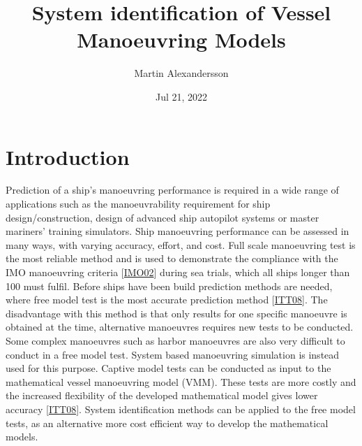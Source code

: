 \documentclass[review]{elsarticle}
\title{System identification of Vessel Manoeuvring Models}
\date{Jul 21, 2022}
\author{Martin Alexandersson}
\begin{document}



\pagestyle{empty}

\pagestyle{plain}

\pagestyle{normal}
\label{\detokenize{index::doc}}



\section{Introduction}
\label{\detokenize{00.02_introduction:introduction}}\label{\detokenize{00.02_introduction::doc}}
\sphinxAtStartPar
Prediction of a ship’s manoeuvring performance is required in a wide range of applications such as the manoeuvrability requirement for ship design/construction, design of advanced ship autopilot systems or master mariners’ training simulators. Ship manoeuvring performance can be assessed in many ways, with varying accuracy, effort, and cost. Full scale manoeuvring test is the most reliable method and is used to demonstrate the compliance with the IMO manoeuvring criteria {[}\hyperlink{cite.bibligraphy:id16}{IMO02}{]} during sea trials, which all ships longer than 100 must fulfil. Before ships have been build prediction methods are needed, where free model test is the most accurate prediction method {[}\hyperlink{cite.bibligraphy:id75}{ITT08}{]}. The disadvantage with this method is that only results for one specific manoeuvre is obtained at the time, alternative manoeuvres requires new tests to be conducted. Some complex manoeuvres such as harbor manoeuvres are also very difficult to conduct in a free model test.
System based manoeuvring simulation is instead used for this purpose. Captive model tests can be conducted as input to the mathematical vessel manoeuvring model (VMM). These tests are more costly and the increased flexibility of the developed mathematical model gives lower accuracy {[}\hyperlink{cite.bibligraphy:id75}{ITT08}{]}. System identification methods can be applied to the free model tests, as an alternative more cost efficient way to develop the mathematical models.
\end{document}
